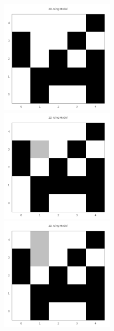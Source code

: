 \begin{figure}[htbp]
  \centering
  \begin{minipage}[b]{6 cm}
    \includegraphics[width=0.5\textwidth]{../Graph_Export/cluster_veranschaulichung/Abbildung41.png}
    \caption{}
  \end{minipage}
  \begin{minipage}[b]{6 cm}
    \includegraphics[width=0.5\textwidth]{../Graph_Export/cluster_veranschaulichung/Abbildung42.png} 
    \caption{}
  \end{minipage}
  \begin{minipage}[b]{6 cm}
    \includegraphics[width=0.5\textwidth]{../Graph_Export/cluster_veranschaulichung/Abbildung43a.png} 

\end{minipage}
\end{figure}
